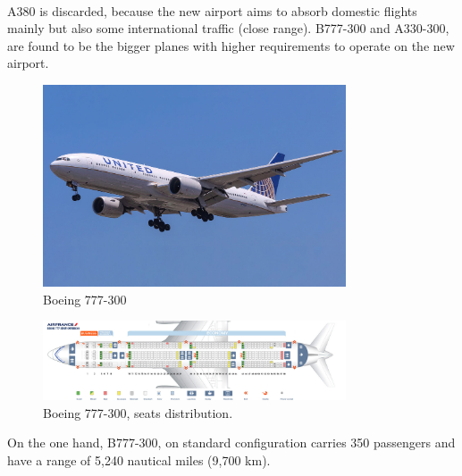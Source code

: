 	\paragraph{} A380 is discarded, because the new airport aims to absorb domestic flights mainly but also some international traffic (close range). B777-300 and A330-300, are found to be the bigger planes with higher requirements to operate on the new airport. 
	\begin{figure}[H]
		\centering
		\includegraphics[clip, trim=0cm 0cm 0cm 0cm, width=0.8\textwidth]{./images/PROGNOSIS/aircraft/b777}
		\caption{Boeing 777-300}
		\label{b777}
	\end{figure}
	\begin{figure}[H]
		\centering
		\includegraphics[clip, trim=0cm 0cm 0cm 0cm, width=0.8\textwidth]{./images/PROGNOSIS/aircraft/b777seats}
		\caption{Boeing 777-300, seats distribution.}
		\label{b777seats}
	\end{figure}

	On the one hand, B777-300, on standard configuration carries 350 passengers and have a range of 5,240 nautical miles (9,700 km).

